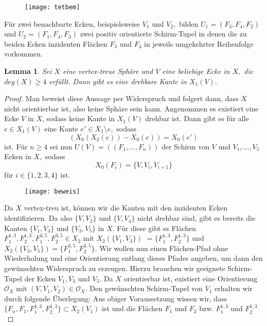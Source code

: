 \documentclass[12pt,titlepage,twoside,cleardoublepage]{article}
\theoremstyle{nummermitklammern}
\newtheorem{lemma}[temp]{Lemma}
\newtheorem{lemma}[zahl]{Lemma}
\numberwithin{equation}{section}
\begin{document}
\begin{figure}[H]
\begin{center}
\texttt{[image: tetbem]}
\end{center}
\end{figure} 
Für zwei benachbarte Ecken, beispielsweise $V_1$ und $V_2,$ bilden $U_1=(F_3,F_4,F_2)$ und $U_2=(F_1,F_4,F_3)$ zwei positiv orientierte Schirm-Tupel in denen die zu beiden Ecken inzidenten Flächen $F_3$ und $F_4$ in jeweils umgekehrter Reihenfolge vorkommen.
\begin{lemma}\label{grad3}
Sei $X$ eine vertex-treue Sphäre und $V$ eine beliebige Ecke in $X,$ die $deg(X)\geq 4$ erfüllt. Dann gibt es eine drehbare Kante in $X_1(V).$ 
\end{lemma}
\begin{proof}
Man beweist diese Aussage per Widerspruch und folgert dann, dass $X$ nicht orientierbar ist, also keine Sphäre sein kann.
Angenommen es existiert eine Ecke $V$ in $X$, sodass keine Kante in $X_1(V)$ drehbar ist. Dann gibt es für alle $e\in X_1(V)$ eine Kante $e'\in X_1\setminus{e},$ sodass 
\[
(X_0(X_2(e))-X_0(e))=X_0(e')
\]
ist.
Für $n\geq 4$ sei nun $U(V)=((F_1,\ldots,F_n))$ der Schirm von $V$ und $V_1,\ldots,V_5$ Ecken in $X,$ sodass  
\[
X_0(F_i)=\{V,V_i,V_{i+1}\}
\] 
für $i\in\{1,2,3,4\}$ ist.
\begin{figure}[H]
\begin{center}
\texttt{[image: beweis]}
\end{center}
\end{figure} 
 Da $X$ vertex-treu ist, können wir die Kanten mit den inzidenten Ecken identifizieren. Da also $\{V,V_2\}$ und $\{V,V_4\}$ nicht drehbar sind, gibt es bereits die Kanten $\{V_1,V_3\}$ und $\{V_3,V_5\}$ in $X$. Für diese gibt es  Flächen $F^{1,3}_1,F^{1,3}_2,F^{3,5}_1,F^{3,5}_2\in X_2$ mit $X_2(\{V_1,V_3\})$ $=\{F^{1,3}_1,F^{1,3}_2\}$ und $X_2(\{V_3,V_5\})=\{F^{3,5}_1,F^{3,5}_2\}$. Wir wollen nun einen Flächen-Pfad ohne Wiederholung und eine Orientierung entlang dieses Pfades angeben, um dann den gewünschten Widerspruch zu erzeugen. Hierzu brauchen wir geeignete Schirm-Tupel der Ecken $V_1,V_3$ und $V_5.$ 
Da $X$ orientierbar ist, existiert eine Orientierung $\mathcal{O}_X$ mit $(V,V_1,V_2)\in \mathcal{O}_X.$
Den gewünschten Schirm-Tupel von $V_1$ erhalten wir durch folgende Überlegung: 
Aus obiger Voraussetzung wissen wir, dass $\{F_n,F_1,F_1^{1,3},F_2^{1,3}\}\subset X_2(V_1)$ ist und die Flächen $F_1$ und $F_2$ bzw. $F^{1,3}_1$ und $F^{1,3}_2$

\end{proof}
\end{document}
